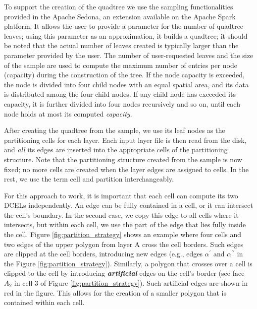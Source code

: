 To support the creation of the quadtree we use the sampling functionalities provided in the Apache Sedona, an extension available on the Apache Spark platform. It allows the user to provide a parameter for the number of quadtree leaves; using this parameter as an approximation, it builds a quadtree; it should be noted that the actual number of leaves created is typically larger than the parameter provided by the user. The number of user-requested leaves and the size of the sample are used to compute the maximum number of entries per node (capacity) during the construction of the tree.  If the node capacity is exceeded, the node is divided into four child nodes with an equal spatial area, and its data is distributed among the four child nodes.  If any child node has exceeded its capacity, it is further divided into four nodes recursively and so on, until each node holds at most its computed \textit{capacity}.

After creating the quadtree from the sample, we use its leaf nodes as the partitioning cells for each layer. Each input layer file is then read from the disk, and \textit{all} its edges are inserted into the appropriate cells of the partitioning structure. Note that the partitioning structure created from the sample is now fixed; no more cells are created when the layer edges are assigned to cells. In the rest, we use the term cell and partition interchangeably.

For this approach to work, it is important that each cell can compute its two DCELs independently. An edge can be fully contained in a cell, or it can intersect  the cell's boundary. In the second case, we copy this edge to all cells where it intersects, but within each cell, we use the part of the edge that lies fully inside the cell. Figure \ref{fig:partition_strategy} shows an example where four cells and two edges of the upper polygon from layer A cross the cell borders.  Such edges are clipped at the cell borders, introducing new edges (e.g., edges $\alpha^{\prime}$ and $\alpha^{\prime \prime}$ in the Figure \ref{fig:partition_strategy}). Similarly, a polygon that crosses over a cell is clipped to the cell by introducing \textit{\textbf{artificial}} edges on the cell's border (see face $A_2$ in cell 3 of Figure \ref{fig:partition_strategy}). Such artificial edges are shown in red in the figure. This allows for the creation of a smaller polygon that is contained within each cell.

